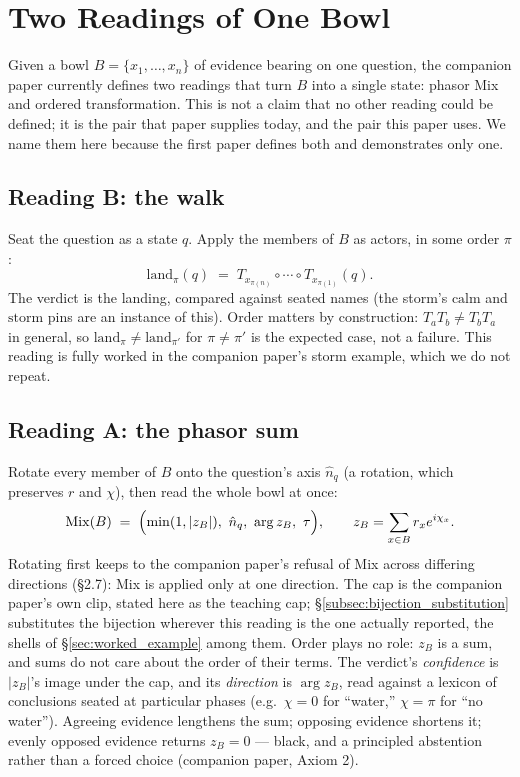 \documentclass[12pt, a4paper]{article}
\begin{document}
\section{Two Readings of One Bowl}
\label{sec:two_readings}

Given a bowl $B=\{x_1,\ldots,x_n\}$ of evidence bearing on one
question, the companion paper currently defines two readings that turn
$B$ into a single state: phasor Mix and ordered transformation. This is
not a claim that no other reading could be defined; it is the pair
that paper supplies today, and the pair this paper uses. We name them
here because the first paper defines both and demonstrates only one.

\subsection{Reading B: the walk}
\label{subsec:reading_b}
Seat the question as a state $q$. Apply the members of $B$ as actors,
in some order $\pi$:
\[
    \mathrm{land}_\pi(q) \;=\; T_{x_{\pi(n)}}\circ\cdots\circ
    T_{x_{\pi(1)}}(q).
\]
The verdict is the landing, compared against seated names (the storm's
$\mathrm{calm}$ and $\mathrm{storm}$ pins are an instance of this).
Order matters by construction: $T_a T_b\neq T_b T_a$ in general, so
$\mathrm{land}_\pi \neq \mathrm{land}_{\pi'}$ for $\pi\neq\pi'$ is the
expected case, not a failure. This reading is fully worked in the
companion paper's storm example, which we do not repeat.

\subsection{Reading A: the phasor sum}
\label{subsec:reading_a}
Rotate every member of $B$ onto the question's axis $\hat n_q$ (a
rotation, which preserves $r$ and $\chi$), then read the whole bowl at
once:
\[
    \mathrm{Mix}(B) \;=\; \Bigl(\min(1,|z_B|),\ \hat n_q,\ \arg z_B,\ \tau\Bigr),
    \qquad
    z_B=\sum_{x\in B} r_x e^{i\chi_x}.
\]
Rotating first keeps to the companion paper's refusal of Mix across differing directions (\S2.7): Mix is
applied only at one direction. The cap is the companion paper's own clip, stated here as the teaching cap; \S\ref{subsec:bijection_substitution} substitutes the bijection
wherever this reading is the one actually reported, the shells of
\S\ref{sec:worked_example} among them.
Order plays no role: $z_B$ is a sum, and sums do not care about the
order of their terms. The verdict's \emph{confidence} is $|z_B|$'s
image under the cap, and its \emph{direction} is $\arg z_B$, read
against a lexicon of conclusions seated at particular phases (e.g.\
$\chi=0$ for ``water,'' $\chi=\pi$ for ``no water''). Agreeing evidence
lengthens the sum; opposing evidence shortens it; evenly opposed
evidence returns $z_B=0$ --- black, and a principled abstention rather
than a forced choice (companion paper, Axiom 2).
\end{document}

